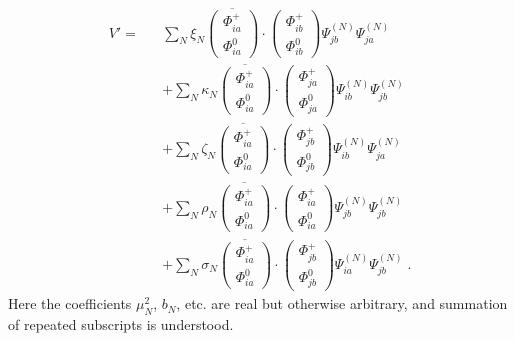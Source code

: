 \begin{eqnarray}
V'=&&\sum_N \xi_N \overline{\left(\begin{array}{c} \Phi^+_{ia}\\ \Phi^0_{ia}\end{array}\right)}\cdot\left(\begin{array}{c} \Phi^+_{ib}\\ \Phi^0_{ib}\end{array}\right)
\Psi^{(N)}_{jb}\Psi^{(N)}_{ja}\nonumber\\&&
+\sum_N \kappa_N \overline{\left(\begin{array}{c} \Phi^+_{ia}\\ \Phi^0_{ia}\end{array}\right)}\cdot\left(\begin{array}{c} \Phi^+_{ja}\\ \Phi^0_{ja}\end{array}\right)
\Psi^{(N)}_{ib}\Psi^{(N)}_{jb}\nonumber\\&&
+\sum_N \zeta_N \overline{\left(\begin{array}{c} \Phi^+_{ia}\\ \Phi^0_{ia}\end{array}\right)}\cdot\left(\begin{array}{c} \Phi^+_{jb}\\ \Phi^0_{jb}\end{array}\right)
\Psi^{(N)}_{ib}\Psi^{(N)}_{ja}\nonumber\\&&
+\sum_N \rho_N \overline{\left(\begin{array}{c} \Phi^+_{ia}\\ \Phi^0_{ia}\end{array}\right)}\cdot\left(\begin{array}{c} \Phi^+_{ia}\\ \Phi^0_{ia}\end{array}\right)
\Psi^{(N)}_{jb}\Psi^{(N)}_{jb}\nonumber\\&&
+\sum_N \sigma_N \overline{\left(\begin{array}{c} \Phi^+_{ia}\\ \Phi^0_{ia}\end{array}\right)}\cdot\left(\begin{array}{c} \Phi^+_{jb}\\ \Phi^0_{jb}\end{array}\right)
\Psi^{(N)}_{ia}\Psi^{(N)}_{jb}\;.
\end{eqnarray}
    Here 
the coefficients $\mu_N^2$, $b_N$, etc. are real but otherwise arbitrary, and summation of repeated subscripts is understood.


